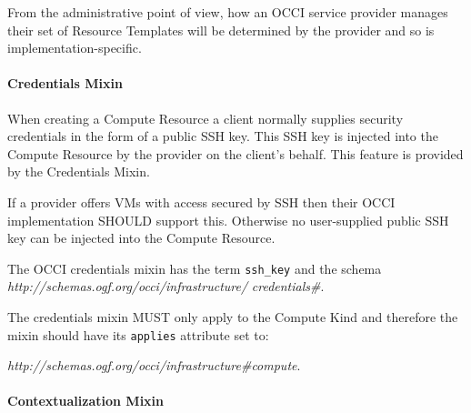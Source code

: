 \documentclass[10pt,a4paper]{article}
\begin{document}

From the administrative point of view, how an OCCI service provider
manages their set of Resource Templates will be determined by
the provider and so is implementation-specific.

\paragraph{Credentials Mixin}

When creating a Compute Resource a client normally supplies security credentials in the form of a public SSH key. This SSH key is injected into the Compute Resource by the provider on the client's behalf. This feature is provided by the Credentials Mixin.

If a provider offers VMs with access secured by SSH then their OCCI implementation SHOULD support this. Otherwise no user-supplied public SSH key can be injected into the Compute Resource.

The OCCI credentials mixin has the term \texttt{ssh\_key} and the schema \textit{http://schemas.ogf.org/occi/infrastructure/} \textit{credentials\#}.

The credentials mixin MUST only apply to the Compute Kind and therefore
the mixin should have its \texttt{applies} attribute set to:

\textit{http://schemas.ogf.org/occi/infrastructure\#compute}.



\paragraph{Contextualization Mixin}
\end{document}
